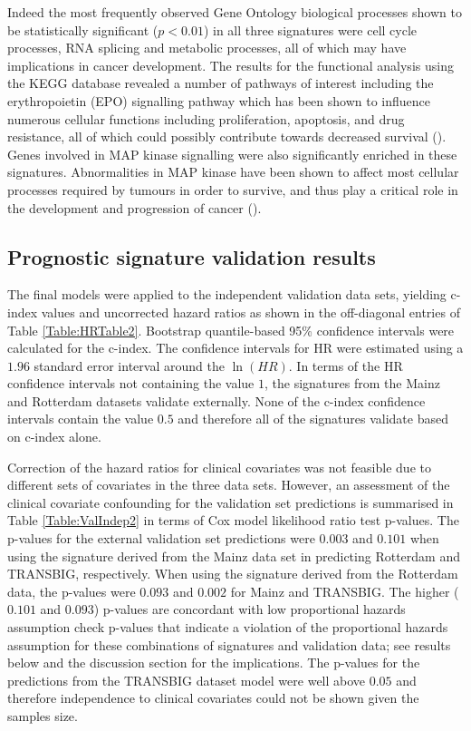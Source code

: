 \documentclass[letterpaper,12pt]{article}
\begin{document}
Indeed the most frequently observed Gene Ontology biological processes shown to be statistically significant ($p < 0.01$) in all three signatures were cell cycle processes, RNA splicing and metabolic processes, all of which may have implications in cancer development. The results for the functional analysis using the KEGG database revealed a number of pathways of interest including the erythropoietin (EPO) signalling pathway which has been shown to influence numerous cellular functions including proliferation, apoptosis, and drug resistance, all of which could possibly contribute towards decreased survival (\citet{Hedley:11}). Genes involved in MAP kinase signalling were also significantly enriched in these signatures. Abnormalities in MAP kinase have been shown to affect most cellular processes required by tumours in order to survive, and thus play a critical role in the development and progression of cancer (\citet{Dhillon:07}). 



\subsection{Prognostic signature validation results}
The final models were applied to the independent validation data sets, yielding c-index values and uncorrected hazard ratios as shown in the off-diagonal entries of Table \ref{Table:HRTable2}. Bootstrap quantile-based 95\% confidence intervals were calculated for the c-index. The confidence intervals for HR were estimated using a $1.96$ standard error interval around the $\ln(HR)$. In terms of the HR confidence intervals not containing the value $1$, the signatures from the Mainz and Rotterdam datasets validate externally. None of the c-index confidence intervals contain the value $0.5$ and therefore all of the signatures validate based on c-index alone.

Correction of the hazard ratios for clinical covariates was not feasible due to different sets of covariates in the three data sets. However, an assessment of the clinical covariate confounding for the validation set predictions is summarised in Table \ref{Table:ValIndep2} in terms of Cox model likelihood ratio test p-values. The p-values for the external validation set predictions were $0.003$ and $0.101$ when using the signature derived from the Mainz data set in predicting Rotterdam and TRANSBIG, respectively. When using the signature derived from the Rotterdam data, the p-values were $0.093$ and $0.002$ for Mainz and TRANSBIG. The higher ($0.101$ and $0.093$) p-values are concordant with low proportional hazards assumption check p-values that indicate a violation of the proportional hazards assumption for these combinations of signatures and validation data; see results below and the discussion section for the implications. The p-values for the predictions from the TRANSBIG dataset model were well above $0.05$ and therefore independence to clinical covariates could not be shown given the samples size.
\end{document}
